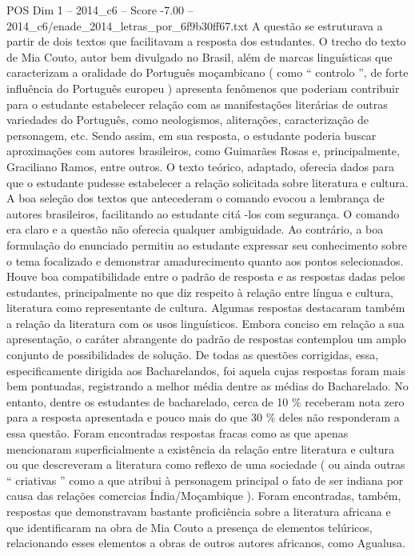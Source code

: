 \begin{textsample}{POS Dim 1 – 2014\_c6 – Score -7.00 – 2014\_c6/enade\_2014\_letras\_por\_6f9b30ff67.txt}
A questão se estruturava a partir de dois textos que facilitavam a resposta dos estudantes.
O trecho do texto de Mia Couto, autor bem divulgado no Brasil, além de marcas linguísticas que caracterizam a oralidade do Português moçambicano ( como “ controlo ”, de forte influência do Português europeu ) apresenta fenômenos que poderiam contribuir para o estudante estabelecer relação com as manifestações literárias de outras variedades do Português, como neologismos, aliterações, caracterização de personagem, etc.
Sendo assim, em sua resposta, o estudante poderia buscar aproximações com autores brasileiros, como Guimarães Rosas e, principalmente, Graciliano Ramos, entre outros.
O texto teórico, adaptado, oferecia dados para que o estudante pudesse estabelecer a relação solicitada sobre literatura e cultura.
A boa seleção dos textos que antecederam o comando evocou a lembrança de autores brasileiros, facilitando ao estudante citá -los com segurança.
O comando era claro e a questão não oferecia qualquer ambiguidade.
Ao contrário, a boa formulação do enunciado permitiu ao estudante expressar seu conhecimento sobre o tema focalizado e demonstrar amadurecimento quanto aos pontos selecionados.
Houve boa compatibilidade entre o padrão de resposta e as respostas dadas pelos estudantes, principalmente no que diz respeito à relação entre língua e cultura, literatura como representante de cultura.
Algumas respostas destacaram também a relação da literatura com os usos linguísticos.
Embora conciso em relação a sua apresentação, o caráter abrangente do padrão de respostas contemplou um amplo conjunto de possibilidades de solução.
De todas as questões corrigidas, essa, especificamente dirigida aos Bacharelandos, foi aquela cujas respostas foram mais bem pontuadas, registrando a melhor média dentre as médias do Bacharelado.
No entanto, dentre os estudantes de bacharelado, cerca de 10 \% receberam nota zero para a resposta apresentada e pouco mais do que 30 \% deles não responderam a essa questão.
Foram encontradas respostas fracas como as que apenas mencionaram superficialmente a existência da relação entre literatura e cultura ou que descreveram a literatura como reflexo de uma sociedade ( ou ainda outras “ criativas ” como a que atribui à personagem principal o fato de ser indiana por causa das relações comercias Índia/Moçambique ).
Foram encontradas, também, respostas que demonstravam bastante proficiência sobre a literatura africana e que identificaram na obra de Mia Couto a presença de elementos telúricos, relacionando esses elementos a obras de outros autores africanos, como Agualusa.

\end{textsample}
